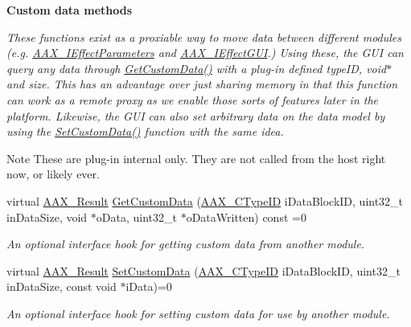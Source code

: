 \begin{Indent}\textbf{ Custom data methods}\par
{\em These functions exist as a proxiable way to move data between different modules (e.\+g. \mbox{\hyperlink{a01825}{A\+A\+X\+\_\+\+I\+Effect\+Parameters}} and \mbox{\hyperlink{a01821}{A\+A\+X\+\_\+\+I\+Effect\+G\+UI}}.) Using these, the G\+UI can query any data through \mbox{\hyperlink{a01669_a4728fcad006d921a07489144360f447e}{Get\+Custom\+Data()}} with a plug-\/in defined {\ttfamily type\+ID}, {\ttfamily void$\ast$} and size. This has an advantage over just sharing memory in that this function can work as a remote proxy as we enable those sorts of features later in the platform. Likewise, the G\+UI can also set arbitrary data on the data model by using the \mbox{\hyperlink{a01669_aa838cad04781853ef2e0b9df22a05170}{Set\+Custom\+Data()}} function with the same idea.

\begin{DoxyNote}{Note}
These are plug-\/in internal only. They are not called from the host right now, or likely ever. 
\end{DoxyNote}
}\begin{DoxyCompactItemize}
\item 
virtual \mbox{\hyperlink{a00392_a4d8f69a697df7f70c3a8e9b8ee130d2f}{A\+A\+X\+\_\+\+Result}} \mbox{\hyperlink{a01669_a4728fcad006d921a07489144360f447e}{Get\+Custom\+Data}} (\mbox{\hyperlink{a00392_ac678f9c1fbcc26315d209f71a147a175}{A\+A\+X\+\_\+\+C\+Type\+ID}} i\+Data\+Block\+ID, uint32\+\_\+t in\+Data\+Size, void $\ast$o\+Data, uint32\+\_\+t $\ast$o\+Data\+Written) const =0
\begin{DoxyCompactList}\small\item\em An optional interface hook for getting custom data from another module. \end{DoxyCompactList}\item 
virtual \mbox{\hyperlink{a00392_a4d8f69a697df7f70c3a8e9b8ee130d2f}{A\+A\+X\+\_\+\+Result}} \mbox{\hyperlink{a01669_aa838cad04781853ef2e0b9df22a05170}{Set\+Custom\+Data}} (\mbox{\hyperlink{a00392_ac678f9c1fbcc26315d209f71a147a175}{A\+A\+X\+\_\+\+C\+Type\+ID}} i\+Data\+Block\+ID, uint32\+\_\+t in\+Data\+Size, const void $\ast$i\+Data)=0
\begin{DoxyCompactList}\small\item\em An optional interface hook for setting custom data for use by another module. \end{DoxyCompactList}\end{DoxyCompactItemize}
\end{Indent}
